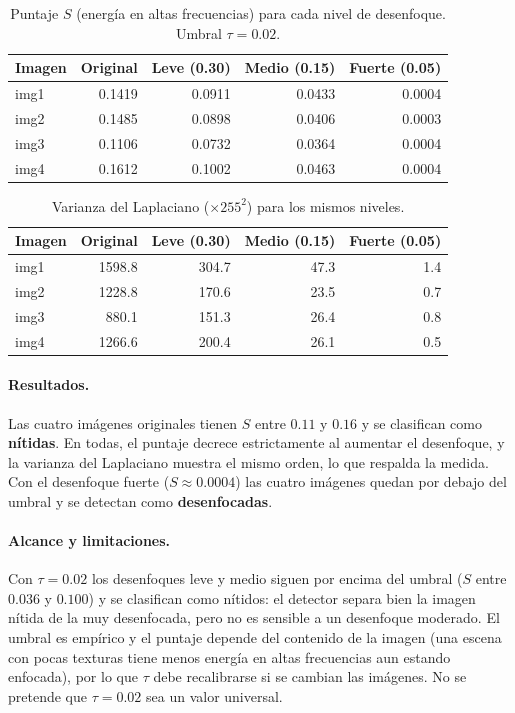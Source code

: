 \documentclass[11pt]{article}
\begin{document}
\begin{table}[!htbp]
\centering
\caption{Puntaje $S$ (energía en altas frecuencias) para cada nivel de desenfoque. Umbral $\tau=0.02$.}
\label{tab:blur}
\begin{tabular}{lrrrr}
\hline
\rowcolor{pastelblue}
Imagen & Original & Leve (0.30) & Medio (0.15) & Fuerte (0.05)\\
\hline
img1 & 0.1419 & 0.0911 & 0.0433 & 0.0004\\
img2 & 0.1485 & 0.0898 & 0.0406 & 0.0003\\
img3 & 0.1106 & 0.0732 & 0.0364 & 0.0004\\
img4 & 0.1612 & 0.1002 & 0.0463 & 0.0004\\
\hline
\end{tabular}
\end{table}

\begin{table}[!htbp]
\centering
\caption{Varianza del Laplaciano ($\times255^2$) para los mismos niveles.}
\label{tab:lap}
\begin{tabular}{lrrrr}
\hline
\rowcolor{pastelblue}
Imagen & Original & Leve (0.30) & Medio (0.15) & Fuerte (0.05)\\
\hline
img1 & 1598.8 & 304.7 & 47.3 & 1.4\\
img2 & 1228.8 & 170.6 & 23.5 & 0.7\\
img3 & 880.1 & 151.3 & 26.4 & 0.8\\
img4 & 1266.6 & 200.4 & 26.1 & 0.5\\
\hline
\end{tabular}
\end{table}

\paragraph{Resultados.}
Las cuatro imágenes originales tienen $S$ entre $0.11$ y $0.16$ y se clasifican como \textbf{nítidas}. En todas, el puntaje
decrece estrictamente al aumentar el desenfoque, y la varianza del Laplaciano muestra el mismo orden, lo que respalda la
medida. Con el desenfoque fuerte ($S\approx0.0004$) las cuatro imágenes quedan por debajo del umbral y se detectan como
\textbf{desenfocadas}.

\paragraph{Alcance y limitaciones.}
Con $\tau=0.02$ los desenfoques leve y medio siguen por encima del umbral ($S$ entre $0.036$ y $0.100$) y se clasifican como
nítidos: el detector separa bien la imagen nítida de la muy desenfocada, pero no es sensible a un desenfoque moderado. El
umbral es empírico y el puntaje depende del contenido de la imagen (una escena con pocas texturas tiene menos energía en
altas frecuencias aun estando enfocada), por lo que $\tau$ debe recalibrarse si se cambian las imágenes. No se pretende que
$\tau=0.02$ sea un valor universal.
\end{document}
